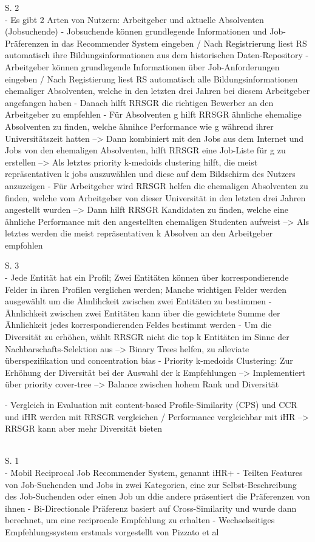 S. 2\\
- Es gibt 2 Arten von Nutzern: Arbeitgeber und aktuelle Absolventen (Jobsuchende)
- Jobsuchende können grundlegende Informationen und Job-Präferenzen in das Recommender System eingeben / Nach Registrierung liest RS automatisch ihre Bildungsinformationen aus dem historischen Daten-Repository
- Arbeitgeber können grundlegende Informationen über Job-Anforderungen eingeben / Nach Registierung liest RS automatisch alle Bildungsinformationen ehemaliger Absolventen, welche in den letzten drei Jahren bei diesem Arbeitgeber angefangen haben
- Danach hilft RRSGR die richtigen Bewerber an den Arbeitgeber zu empfehlen
- Für Absolventen g hilft RRSGR ähnliche ehemalige Absolventen zu finden, welche ähnihce Performance wie g während ihrer Universitätszeit hatten --> Dann kombiniert mit den Jobs aus dem Internet und Jobs von den ehemaligen Absolventen, hilft RRSGR eine Job-Liste für g zu erstellen --> Als letztes priority k-medoids clustering hilft, die meist repräsentativen k jobs auszuwählen und diese auf dem Bildschirm des Nutzers anzuzeigen
- Für Arbeitgeber wird RRSGR helfen die ehemaligen Absolventen zu finden, welche vom Arbeitgeber von dieser Universität in den letzten drei Jahren angestellt wurden --> Dann hilft RRSGR Kandidaten zu finden, welche eine ähnliche Performance mit den angestellten ehemaligen Studenten aufweist --> Als letztes werden die meist repräsentativen k Absolven an den Arbeitgeber empfohlen

S. 3\\
- Jede Entität hat ein Profil; Zwei Entitäten können über korrespondierende Felder in ihren Profilen verglichen werden; Manche wichtigen Felder werden ausgewählt um die Ähnlihckeit zwischen zwei Entitäten zu bestimmen
- Ähnlichkeit zwischen zwei Entitäten kann über die gewichtete Summe der Ähnlichkeit jedes korrespondierenden Feldes bestimmt werden
- Um die Diversität zu erhöhen, wählt RRSGR nicht die top k Entitäten im Sinne der Nachbarschafts-Selektion aus --> Binary Trees helfen, zu alleviate überspezifikation und concentration bias
- Priority k-medoids Clustering: Zur Erhöhung der Diversität bei der Auswahl der k Empfehlungen --> Implementiert über priority cover-tree --> Balance zwischen hohem Rank und Diversität

- Vergleich in Evaluation mit content-based Profile-Similarity (CPS) und CCR und iHR werden mit RRSGR vergleichen / Performance vergleichbar mit iHR --> RRSGR kann aber mehr Diversität bieten

\textcite{wenxing:2015}\\
S. 1\\
- Mobil Reciprocal Job Recommender System, genannt iHR+
- Teilten Features von Job-Suchenden und Jobs in zwei Kategorien, eine zur Selbst-Beschreibung des Job-Suchenden oder einen Job un ddie andere präsentiert die Präferenzen von ihnen
- Bi-Directionale Präferenz basiert auf Cross-Similarity und wurde dann berechnet, um eine reciprocale Empfehlung zu erhalten
- Wechselseitiges Empfehlungssystem erstmals vorgestellt von Pizzato et al

